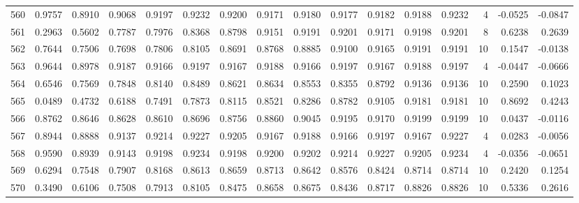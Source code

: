 \begin{tabular}{lrrrrrrrrrrrrrrr}
560 &      0.9757 &  0.8910 &  0.9068 &  0.9197 &  0.9232 &  0.9200 &  0.9171 &  0.9180 &  0.9177 &  0.9182 &   0.9188 &     0.9232 &      4 &                   -0.0525 &                    -0.0847 \\
561 &      0.2963 &  0.5602 &  0.7787 &  0.7976 &  0.8368 &  0.8798 &  0.9151 &  0.9191 &  0.9201 &  0.9171 &   0.9198 &     0.9201 &      8 &                    0.6238 &                     0.2639 \\
562 &      0.7644 &  0.7506 &  0.7698 &  0.7806 &  0.8105 &  0.8691 &  0.8768 &  0.8885 &  0.9100 &  0.9165 &   0.9191 &     0.9191 &     10 &                    0.1547 &                    -0.0138 \\
563 &      0.9644 &  0.8978 &  0.9187 &  0.9166 &  0.9197 &  0.9167 &  0.9188 &  0.9166 &  0.9197 &  0.9167 &   0.9188 &     0.9197 &      4 &                   -0.0447 &                    -0.0666 \\
564 &      0.6546 &  0.7569 &  0.7848 &  0.8140 &  0.8489 &  0.8621 &  0.8634 &  0.8553 &  0.8355 &  0.8792 &   0.9136 &     0.9136 &     10 &                    0.2590 &                     0.1023 \\
565 &      0.0489 &  0.4732 &  0.6188 &  0.7491 &  0.7873 &  0.8115 &  0.8521 &  0.8286 &  0.8782 &  0.9105 &   0.9181 &     0.9181 &     10 &                    0.8692 &                     0.4243 \\
566 &      0.8762 &  0.8646 &  0.8628 &  0.8610 &  0.8696 &  0.8756 &  0.8860 &  0.9045 &  0.9195 &  0.9170 &   0.9199 &     0.9199 &     10 &                    0.0437 &                    -0.0116 \\
567 &      0.8944 &  0.8888 &  0.9137 &  0.9214 &  0.9227 &  0.9205 &  0.9167 &  0.9188 &  0.9166 &  0.9197 &   0.9167 &     0.9227 &      4 &                    0.0283 &                    -0.0056 \\
568 &      0.9590 &  0.8939 &  0.9143 &  0.9198 &  0.9234 &  0.9198 &  0.9200 &  0.9202 &  0.9214 &  0.9227 &   0.9205 &     0.9234 &      4 &                   -0.0356 &                    -0.0651 \\
569 &      0.6294 &  0.7548 &  0.7907 &  0.8168 &  0.8613 &  0.8659 &  0.8713 &  0.8642 &  0.8576 &  0.8424 &   0.8714 &     0.8714 &     10 &                    0.2420 &                     0.1254 \\
570 &      0.3490 &  0.6106 &  0.7508 &  0.7913 &  0.8105 &  0.8475 &  0.8658 &  0.8675 &  0.8436 &  0.8717 &   0.8826 &     0.8826 &     10 &                    0.5336 &                     0.2616 \\

\end{tabular}
